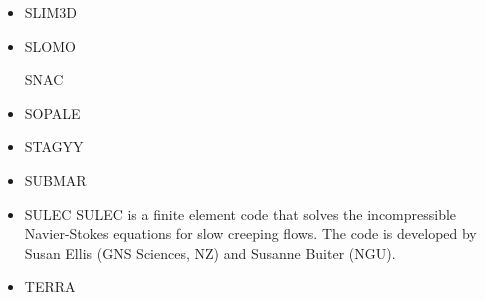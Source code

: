 \begin{itemize}
\cite{olbm16}

\item SLIM3D

\cite{poso08}
\cite{qusp10}
\cite{brps12}
\cite{brps13}
\cite{brau13}
\cite{brun14}
\cite{hebr14}
\cite{kobf14}
\cite{clbq15}

\item SLOMO
\cite{kaus05}

\index SNAC
\cite{chlg08}


\item SOPALE

\cite{wibe94}
\cite{befh94}
\cite{full95}
\cite{elfb95}
\cite{bekh96}
\cite{will99a}
\cite{will99b}
\cite{pybf00}
\cite{bemh00}
\cite{bejn01}
\cite{hube02}
\cite{pybf02}
\cite{hube03}
\cite{vamf03}
\cite{wipo03}
\cite{pymi03}
\cite{bejn04}
\cite{pycr04}
\cite{pybe04}
\cite{elsp04}
\cite{geim04}
\cite{gebi05}
\cite{hubb05}
\cite{pysk06}
\cite{selz06}
\cite{hube07}
\cite{cubh07}
\cite{mohb07}
\cite{sebp08}
\cite{wabj08}
\cite{wabj08b}
\cite{kecw09}
\cite{bejb09}
\cite{bupb09}
\cite{grba09}
\cite{sihb09}
\cite{albs10}
\cite{albe10}
\cite{grpy10}
\cite{pygp10}
\cite{cube11}
\cite{bubj11}
\cite{hube11}
\cite{grpy12}
\cite{grpy12b}
\cite{kogp12}
\cite{grbe12}
\cite{jahu12}
\cite{bubj13}
\cite{chbe13}
\cite{fihv13a}
\cite{fihv13b}
\cite{gobi13}
\cite{grpy13}
\cite{knak13}
\cite{nipc13}
\cite{jahm13}
\cite{gogu14}
\cite{albe15}
\cite{bubj15}
\cite{heps15}
\cite{licu16}
\cite{bube17}


\item STAGYY
\cite{rota11}
\cite{yadl14}
\cite{crta14}


\item SUBMAR
\cite{masr06}
\cite{masp07}
\cite{roms10}


\item SULEC
SULEC is a finite element code that solves the incompressible Navier-Stokes equations 
for slow creeping flows. The code is developed by Susan Ellis 
(GNS Sciences, NZ) and Susanne Buiter (NGU). 

\cite{qube11}
\cite{ellw11}
\cite{buit12}
\cite{tebu12} 
\cite{crsg12}
\cite{grel12}
\cite{ghbu13}
\cite{ghbu14}
\cite{qubu14}
\cite{nabu15}
\cite{zwsn16}
\cite{tebu17}










\item TERRA
\cite{burb97}
\cite{burl98}
\cite{phbs09}
\cite{wodd09}
\cite{woda11}
\cite{dadb13}
\cite{vade16}


\end{itemize}
